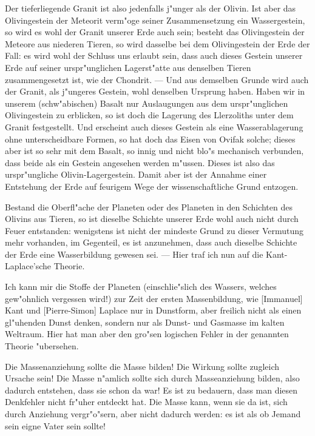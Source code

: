 \documentclass[a4paper, 11pt, oneside]{article}
\begin{document}
Der tieferliegende Granit ist also jedenfalls j"unger als der Olivin. Ist aber das Olivingestein der Meteorit verm"oge seiner Zusammensetzung ein Wassergestein, so wird es wohl der Granit unserer Erde auch sein; besteht das Olivingestein der Meteore aus niederen Tieren, so wird dasselbe bei dem Olivingestein der Erde der Fall: es wird wohl der Schluss uns erlaubt sein, dass auch dieses Gestein unserer Erde auf seiner urspr"unglichen Lagerst"atte aus denselben Tieren zusammengesetzt ist, wie der Chondrit. --- Und aus demselben Grunde wird auch der Granit, als j"ungeres Gestein, wohl denselben Ursprung haben. Haben wir in unserem (schw"abischen) Basalt nur Auslaugungen aus dem urspr"unglichen Olivingestein zu erblicken, so ist doch die Lagerung des Llerzoliths unter dem Granit festgestellt. Und erscheint auch dieses Gestein als eine Wasserablagerung ohne unterscheidbare Formen, so hat doch das Eisen von Ovifak solche; dieses aber ist so sehr mit dem Basalt, so innig und nicht blo"s mechanisch verbunden, dass beide als ein Gestein angesehen werden m"ussen. Dieses ist also das urspr"ungliche Olivin-Lagergestein. Damit aber ist der Annahme einer Entstehung der Erde auf feurigem Wege der wissenschaftliche Grund entzogen.

Bestand die Oberfl"ache der Planeten oder des Planeten in den Schichten des Olivins aus Tieren, so ist dieselbe Schichte unserer Erde wohl auch nicht durch Feuer entstanden: wenigstens ist nicht der mindeste Grund zu dieser Vermutung mehr vorhanden, im Gegenteil, es ist anzunehmen, dass auch dieselbe Schichte der Erde eine Wasserbildung gewesen sei. --- Hier traf ich nun auf die Kant-Laplace'sche Theorie.

Ich kann mir die Stoffe der Planeten (einschlie"slich des Wassers, welches gew"ohnlich vergessen wird!) zur Zeit der ersten Massenbildung, wie [Immanuel] Kant und [Pierre-Simon] Laplace nur in Dunstform, aber freilich nicht als einen gl"uhenden Dunst denken, sondern nur als Dunst- und Gasmasse im kalten Weltraum. Hier hat man aber den gro"sen logischen Fehler in der genannten Theorie "ubersehen.

Die Massenanziehung sollte die Masse bilden! Die Wirkung sollte zugleich Ursache sein! Die Masse n"amlich sollte sich durch Masseanziehung bilden, also dadurch entstehen, dass sie schon da war! Es ist zu bedauern, dass man diesen Denkfehler nicht fr"uher entdeckt hat. Die Masse kann, wenn sie da ist, sich durch Anziehung vergr"o"sern, aber nicht dadurch werden: es ist als ob Jemand sein eigne Vater sein sollte!
\end{document}
